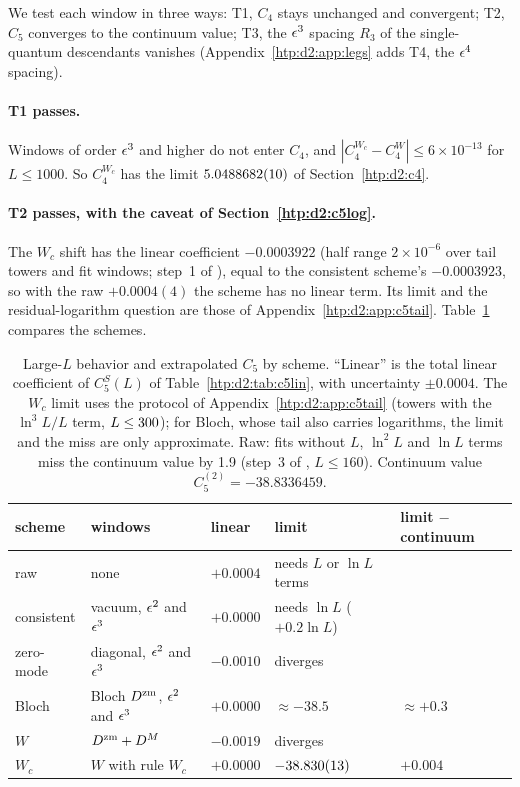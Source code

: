 We test each window in three ways: T1, $C_4$ stays unchanged and convergent; T2, $C_5$ converges to the continuum value; T3,
the $\epsilon^3$ spacing $R_3$ of the single-quantum descendants vanishes (Appendix~\ref{htp:d2:app:legs} adds T4, the $\epsilon^4$
spacing).

\paragraph{T1 passes.} Windows of order $\epsilon^3$ and higher do not enter $C_4$, and $|C_4^{W_c}-C_4^W|\le6\times10^{-13}$ for
$L\le1000$. So $C_4^{W_c}$ has the limit $5.0488682(10)$ of Section~\ref{htp:d2:c4}.

\paragraph{T2 passes, with the caveat of Section~\ref{htp:d2:c5log}.} The $W_c$ shift has the linear coefficient $-0.0003922$
(half range $2\times10^{-6}$ over tail towers and fit windows; step~1 of ), equal to the consistent
scheme's $-0.0003923$, so with the raw $+0.0004(4)$ the scheme has no linear term. Its limit and the residual-logarithm
question are those of Appendix~\ref{htp:d2:app:c5tail}. Table~\ref{htp:d2:tab:c5schemes} compares the schemes.

\begin{table}[ht]
\centering\footnotesize\renewcommand{\arraystretch}{1.15}
\begin{tabular}{@{}p{2.6cm}p{3.6cm}p{1.6cm}p{3.6cm}p{2.6cm}@{}}
\toprule
scheme & windows & linear & limit & limit $-$ continuum \\\midrule
raw & none & $+0.0004$ & needs $L$ or $\ln L$ terms & \\
consistent & vacuum, $\epsilon^2$ and $\epsilon^3$ & $+0.0000$ & needs $\ln L$ ($+0.2\ln L$) & \\
zero-mode & diagonal, $\epsilon^2$ and $\epsilon^3$ & $-0.0010$ & diverges & \\
Bloch & Bloch $D^{\rm zm}$, $\epsilon^2$ and $\epsilon^3$ & $+0.0000$ & ${\approx}-38.5$ & ${\approx}+0.3$ \\
$W$ & $D^{\rm zm}+D^M$ & $-0.0019$ & diverges & \\
$W_c$ & $W$ with rule $W_c$ & $+0.0000$ & $-38.830(13)$ & $+0.004$ \\
\bottomrule
\end{tabular}
\caption{Large-$L$ behavior and extrapolated $C_5$ by scheme. ``Linear'' is the total linear coefficient of $C_5^S(L)$ of
Table~\ref{htp:d2:tab:c5lin}, with uncertainty $\pm0.0004$. The $W_c$ limit uses the protocol of
Appendix~\ref{htp:d2:app:c5tail} (towers with the $\ln^3L/L$ term, $L\le300$); for Bloch, whose tail also carries
logarithms, the limit and the miss are only approximate. Raw: fits without $L$, $\ln^2L$ and $\ln L$ terms miss the continuum
value by 1.9 (step~3 of , $L\le160$). Continuum value $C_5^{(2)}=-38.8336459$.}
\label{htp:d2:tab:c5schemes}
\end{table}

